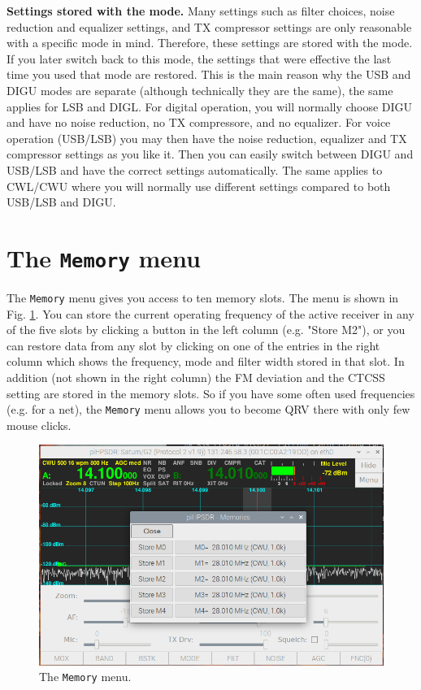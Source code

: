 \documentclass[12pt]{book}
\def\bltt#1{\texttt{\color{blue}#1}}
\begin{document}
\textbf{Settings stored with the mode.} Many settings such as filter choices, noise reduction
and equalizer settings, and TX compressor settings
 are only reasonable with a specific mode in mind. Therefore, these settings are stored with
 the mode. If you later switch back to this mode, the settings that were effective the last
 time you used that mode are restored. This is the main reason why the USB and DIGU modes
 are separate (although technically they are the same), the same applies for LSB and DIGL.
 For digital operation, you will normally choose DIGU and have no noise reduction, no TX
 compressore, and no equalizer. For voice operation (USB/LSB) you may then have the
 noise reduction, equalizer and TX compressor settings as you like it. Then you can easily
 switch between DIGU and USB/LSB and have the correct settings automatically. The same applies
 to CWL/CWU where you will normally use different settings compared to both USB/LSB and DIGU.

\section{The \texttt{Memory}  menu}
\label{sec:memmenu}

The \bltt{Memory} menu gives you access to ten memory slots. The menu is shown in Fig. \ref{fig:MemMenu}.
You can store the current
operating frequency  of the active receiver in any of the five slots by clicking a
button in the left column (e.g. "Store M2"), or you can restore
data from any slot by clicking on one of the entries in the right column
which shows the frequency, mode and filter width stored in that slot.
In addition (not shown in the right column) the FM deviation and the CTCSS setting are stored
in the memory slots.
 So if you have some often used frequencies (e.g. for a net), the
\bltt{Memory} menu allows you to become QRV there with only few mouse clicks.

 \begin{figure}[ht]
\center
\includegraphics[width=12cm]{MemMenu.png}
\caption{The \bltt{Memory} menu.}
\label{fig:MemMenu}
\end{figure}
\end{document}
